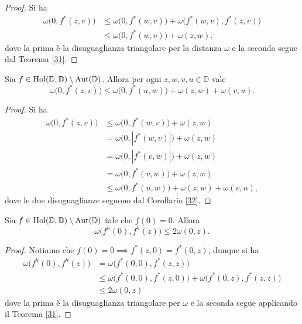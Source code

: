 \begin{proof}
  Si ha
  \begin{align*}
    \omega\bigl(0,f^*(z,v)\bigr) & \le \omega\bigl(0,f^*(w,v)\bigr)+\omega\bigl(f^*(w,v),f^*(z,v)\bigr) \\
    & \le \omega\bigl(0,f^*(w,v)\bigr)+\omega(z,w),
  \end{align*}
  dove la prima è la disuguaglianza triangolare per la distanza $\omega$ e la seconda segue dal Teorema \ref{31}.
\end{proof}

\begin{cor} \label{33}
  Sia $f \in \text{\normalfont{Hol}}(\mathbb{D},\mathbb{D})\setminus\text{\normalfont{Aut}}(\mathbb{D})$. Allora per ogni $z, w, v, u \in \mathbb{D}$ vale
  \begin{equation}
    \omega\bigl(0, f^*(z,v)\bigr) \le \omega\bigl(0, f^*(u,w)\bigr)+\omega(z,w)+\omega(v,u).
  \end{equation}
\end{cor}

\begin{proof}
  Si ha
  \begin{align*}
    \omega\bigl(0,f^*(z,v)\bigr) & \le \omega\bigl(0,f^*(w,v)\bigr)+\omega(z,w) \\
    & =\omega\bigl(0,|f^*(w,v)|\bigr)+\omega(z,w) \\
    & =\omega\bigl(0,|f^*(v,w)|\bigr)+\omega(z,w) \\
    & =\omega\bigl(0,f^*(v,w)\bigr)+\omega(z,w) \\
    & \le \omega\bigl(0,f^*(u,w)\bigr)+\omega(z,w)+\omega(v,u),
  \end{align*}
  dove le due disuguaglianze seguono dal Corollario \ref{32}.
\end{proof}


\begin{cor} \label{36}
  Sia $f \in \text{\normalfont{Hol}}(\mathbb{D},\mathbb{D})\setminus\text{\normalfont{Aut}}(\mathbb{D})$ tale che $f(0)=0$. Allora
  \begin{equation}
    \omega\bigl(f^h(0),f^h(z)\bigr) \le 2\omega(0,z).
  \end{equation}
\end{cor}

\begin{proof}
  Notiamo che $f(0)=0 \implies f^*(z,0)=f^*(0,z)$, dunque si ha
  \begin{align*}
    \omega\bigl(f^h(0),f^h(z)\bigr) & = \omega\bigl(f^*(0,0),f^*(z,z)\bigr) \\
    & \le \omega\bigl(f^*(0,0),f^*(z,0)\bigr)+\omega\bigl(f^*(0,z),f^*(z,z)\bigr) \\
    & \le 2\omega(0,z)
  \end{align*}
  dove la prima è la disuguaglianza triangolare per $\omega$ e la seconda segue applicando il Teorema \ref{31}.
\end{proof}

